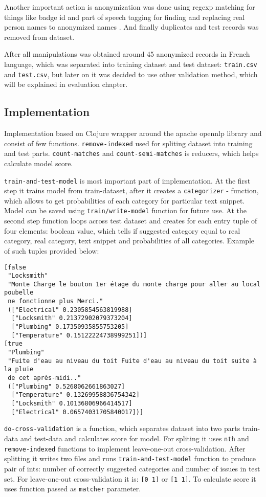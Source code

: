\documentclass[14pt]{extarticle}
\begin{document}
Another important action is anonymization was done using regexp matching for
things like badge id and part of speech tagging for finding and replacing real
person names to anonymized names \cite{crfpostagger}. And finally duplicates
and test records was removed from dataset.

After all manipulations was obtained around 45 anonymized records in French
language, which was separated into training dataset and test dataset:
\texttt{train.csv} and \texttt{test.csv}, but later on it was decided to use other validation
method, which will be explained in evaluation chapter.

\subsection{Implementation}
\label{sec:org1bbe374}
Implementation based on Clojure wrapper around the apache opennlp library
\cite{apacheopennlp} and consist of few functions. \texttt{remove-indexed} used for
spliting dataset into training and test parts. \texttt{count-matches} and
\texttt{count-semi-matches} is reducers, which helps calculate model score.

\texttt{train-and-test-model} is most important part of implementation. At the first
step it trains model from train-dataset, after it creates a \texttt{categorizer} -
function, which allows to get probabilities of each category for particular text
snippet. Model can be saved using \texttt{train/write-model} function for future use.
At the second step function loops across test dataset and creates for each entry
tuple of four elements: boolean value, which tells if suggested category equal
to real category, real category, text snippet and probabilities of all categories.
Example of such tuples provided below:

\begin{verbatim}
[false
 "Locksmith"
 "Monte Charge le bouton 1er étage du monte charge pour aller au local poubelle
 ne fonctionne plus Merci."
 (["Electrical" 0.2305854563819988]
  ["Locksmith" 0.21372902079373204]
  ["Plumbing" 0.17350935855753205]
  ["Temperature" 0.15122224738999251])]
[true
 "Plumbing"
 "Fuite d'eau au niveau du toit Fuite d'eau au niveau du toit suite à la pluie
 de cet après-midi.."
 (["Plumbing" 0.5268062661863027]
  ["Temperature" 0.13269958836754342]
  ["Locksmith" 0.10136806966414517]
  ["Electrical" 0.06574031705840017])]
\end{verbatim}

\texttt{do-cross-validation} is a function, which separates dataset into two parts
train-data and test-data and calculates score for model. For spliting it uses
\texttt{nth} and \texttt{remove-indexed} functions to implement leave-one-out
cross-validation. After splitting it writes two files and runs
\texttt{train-and-test-model} function to produce pair of ints: number of correctly
suggested categories and number of issues in test set. For leave-one-out
cross-validation it is: \texttt{[0 1]} or \texttt{[1 1]}. To calculate score it uses function
passed as \texttt{matcher} parameter.
\end{document}
